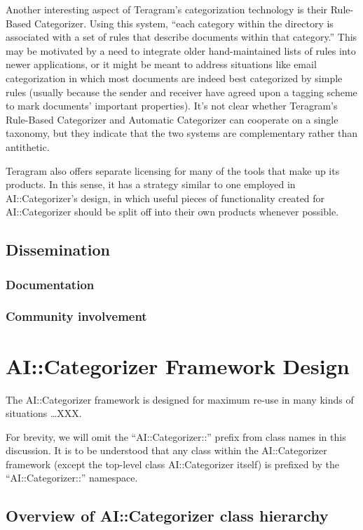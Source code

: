 \documentclass[a4paper]{report}
\begin{document}
Another interesting aspect of Teragram's categorization technology is
their Rule-Based Categorizer.  Using this system, ``each category
within the directory is associated with a set of rules that describe
documents within that category.''  This may be motivated by a need to
integrate older hand-maintained lists of rules into newer
applications, or it might be meant to address situations like email
categorization in which most documents are indeed best categorized by
simple rules (usually because the sender and receiver have agreed upon
a tagging scheme to mark documents' important properties).  It's not
clear whether Teragram's Rule-Based Categorizer and Automatic
Categorizer can cooperate on a single taxonomy, but they indicate that
the two systems are complementary rather than antithetic.

Teragram also offers separate licensing for many of the tools that
make up its products.  In this sense, it has a strategy similar to one
employed in AI::Categorizer's design, in which useful pieces of
functionality created for AI::Categorizer should be split off into
their own products whenever possible.

\section{Dissemination}
\subsection{Documentation}
\subsection{Community involvement}

\chapter{AI::Categorizer Framework Design}

The AI::Categorizer framework is designed for maximum re-use in many
kinds of situations \ldots XXX.

For brevity, we will omit the ``AI::Categorizer::'' prefix from class
names in this discussion.  It is to be understood that any class
within the AI::Categorizer framework (except the top-level class
AI::Categorizer itself) is prefixed by the ``AI::Categorizer::''
namespace.

\section{Overview of AI::Categorizer class hierarchy}
\end{document}
